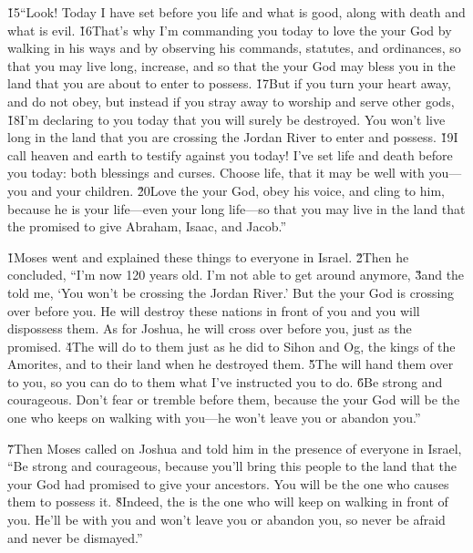 \v{15}``Look! Today I have set before you life and what is good, along with death and what is evil. \v{16}That's why I'm commanding you today to love the  your God by walking in his ways and by observing his commands, statutes, and ordinances, so that you may live long, increase, and so that the  your God may bless you in the land that you are about to enter to possess. \v{17}But if you turn your heart away, and do not obey, but instead if you stray away to worship and serve other gods, \v{18}I'm declaring to you today that you will surely be destroyed. You won't live long in the land that you are crossing the Jordan River to enter and possess. \v{19}I call heaven and earth to testify against you today! I've set life and death before you today: both blessings and curses. Choose life, that it may be well with you---you and your children. \v{20}Love the  your God, obey his voice, and cling to him, because he is your life---even your long life---so that you may live in the land that the  promised to give Abraham, Isaac, and Jacob.''

\v{1}Moses went and explained these things to everyone in Israel. \v{2}Then he concluded, ``I'm now 120 years old. I'm not able to get around anymore, \v{3}and the  told me, `You won't be crossing the Jordan River.' But the  your God is crossing over before you. He will destroy these nations in front of you and you will dispossess them. As for Joshua, he will cross over before you, just as the  promised. \v{4}The  will do to them just as he did to Sihon and Og, the kings of the Amorites, and to their land when he destroyed them. \v{5}The  will hand them over to you, so you can do to them what I've instructed you to do. \v{6}Be strong and courageous. Don't fear or tremble before them, because the  your God will be the one who keeps on walking with you---he won't leave you or abandon you.''

\v{7}Then Moses called on Joshua and told him in the presence of everyone in Israel, ``Be strong and courageous, because you'll bring this people to the land that the  your God had promised to give your ancestors. You will be the one who causes them to possess it. \v{8}Indeed, the  is the one who will keep on walking in front of you. He'll be with you and won't leave you or abandon you, so never be afraid and never be dismayed.''


